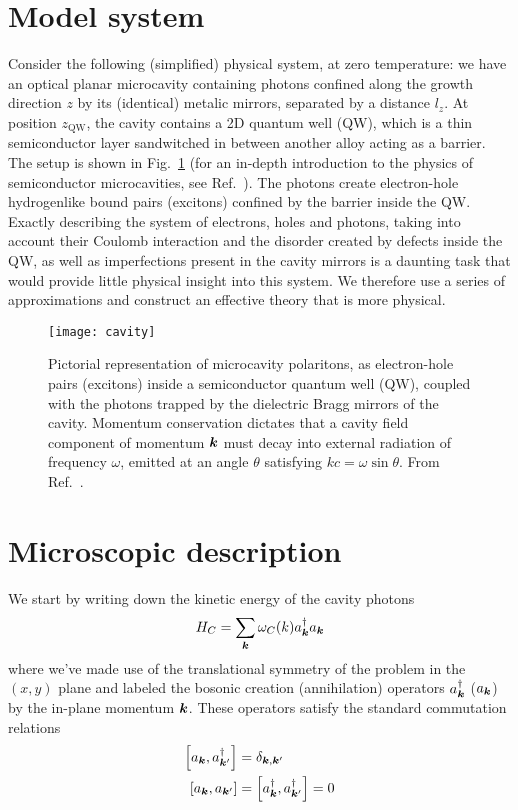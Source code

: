 \section{Model system}
\label{sec:model}



Consider the following (simplified) physical system, at zero
temperature: we have an optical planar microcavity containing photons
confined along the growth direction $z$ by its (identical) metalic
mirrors, separated by a distance $l_z$. At position $z_{\text{QW}}$,
the cavity contains a 2D quantum well (QW), which is a thin
semiconductor layer sandwitched in between another alloy acting as a
barrier. The setup is shown in Fig.~\ref{fig:cavity-polaritons} (for
an in-depth introduction to the physics of semiconductor
microcavities, see Ref.~\cite{9780199228942}). The photons create
electron-hole hydrogenlike bound pairs (excitons) confined by the
barrier inside the QW. Exactly describing the system of electrons,
holes and photons, taking into account their Coulomb interaction and
the disorder created by defects inside the QW, as well as
imperfections present in the cavity mirrors is a daunting task that
would provide little physical insight into this system. We therefore
use a series of approximations and construct an effective theory that
is more physical.
%
\begin{figure}[tb]\centering
  \texttt{[image: cavity]}
  \caption{
    Pictorial representation of microcavity polaritons, as electron-hole pairs (excitons) inside a semiconductor quantum well (QW), 
    coupled with the photons trapped by the dielectric Bragg mirrors of the cavity. 
    Momentum conservation dictates that a cavity field component of momentum $\bm{k}$ must decay into external radiation of frequency $\omega$, emitted at an angle $\theta$ satisfying $k c = \omega \sin\theta$.
    From Ref.~\cite{Kasprzak_2006}.
  }\label{fig:cavity-polaritons}
\end{figure}

\section{Microscopic description}
\label{sec:microscopic}


We start by writing down the kinetic energy of the cavity photons
%
\begin{equation}\label{eq:cavity-energy}
  H_{C} = \sum_{\bm{k}} \omega_C(k) a_{\bm{k}}^{\dagger} a_{\bm{k}}
\end{equation}
% 
where we've made use of the translational symmetry of the problem in
the $(x,y)$ plane and labeled the bosonic creation (annihilation)
operators $a_{\bm{k}}^{\dagger}$ ($a_{\bm{k}}$) by the in-plane momentum
$\bm{k}$. These operators satisfy the standard commutation relations
\begin{align}
  \left[a_{\bm{k}}, a_{\bm{k}^{\prime}}^{\dagger}\right] & =\delta_{\bm{k},\bm{k}^{\prime}}\\
  \left[a_{\bm{k}}, a_{\bm{k}^{\prime}}\right] & =\left[a_{\bm{k}}^{\dagger}, a_{\bm{k}^{\prime}}^{\dagger}\right] = 0
\end{align}

